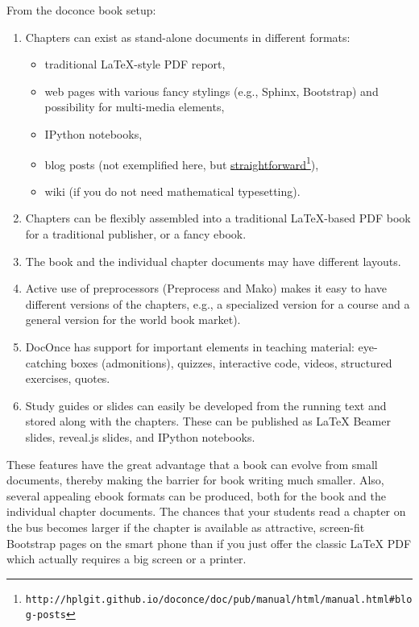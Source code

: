 \documentclass[graybox,envcountchap,sectrefs,final]{svmonodo}
\begin{document}
From the doconce book setup:
\begin{enumerate}
\item Chapters can exist as stand-alone documents in different formats:
\begin{itemize}

   \item traditional LaTeX-style PDF report,

   \item web pages with various fancy stylings (e.g., Sphinx, Bootstrap)
     and possibility for multi-media elements,

   \item IPython notebooks,

   \item blog posts (not exemplified here, but \href{{http://hplgit.github.io/doconce/doc/pub/manual/html/manual.html#blog-posts}}{straightforward}\footnote{\texttt{http://hplgit.github.io/doconce/doc/pub/manual/html/manual.html\#blog-posts}}),

   \item wiki (if you do not need mathematical typesetting).

\end{itemize}

\noindent
\item Chapters can be flexibly assembled into a traditional LaTeX-based
   PDF book for a traditional publisher, or a fancy ebook.

\item The book and the individual chapter documents may have different
   layouts.

\item Active use of preprocessors (Preprocess and Mako) makes it
   easy to have different versions of the chapters,
   e.g., a specialized version for a course and
   a general version for the world book market).

\item DocOnce has support for important elements in teaching material:
   eye-catching boxes (admonitions), quizzes, interactive code,
   videos, structured exercises, quotes.

\item Study guides or slides can easily be developed from the running
   text and stored along with the chapters. These can be published
   as {\LaTeX} Beamer slides, reveal.js slides, and IPython notebooks.
\end{enumerate}

\noindent
These features have the great advantage that a book can evolve from
small documents, thereby making the barrier for book writing much smaller.
Also, several appealing ebook formats can be produced, both for the
book and the individual chapter documents. The chances that your students
read a chapter on the bus becomes larger if the chapter is available
as attractive, screen-fit Bootstrap pages on the smart phone than if you
just offer the classic {\LaTeX} PDF which actually requires a big screen or a
printer.
\end{document}
